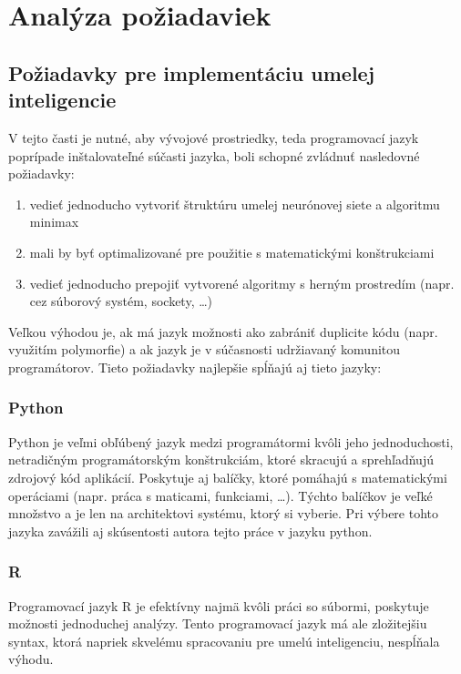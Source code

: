 \section{Analýza požiadaviek}\label{sec:requirements}

\subsection{Požiadavky pre implementáciu umelej inteligencie}\label{subsec:requirements-ai}

V tejto časti je nutné, aby vývojové prostriedky, teda programovací jazyk poprípade inštalovateľné súčasti jazyka, boli
schopné zvládnuť nasledovné požiadavky:
\begin{enumerate}
    \item vedieť jednoducho vytvoriť štruktúru umelej neurónovej siete a algoritmu minimax
    \item mali by byť optimalizované pre použitie s matematickými konštrukciami
    \item vedieť jednoducho prepojiť vytvorené algoritmy s herným prostredím (napr. cez súborový systém, sockety, \ldots)
\end{enumerate}
Veľkou výhodou je, ak má jazyk možnosti ako zabrániť duplicite kódu (napr. využitím polymorfie) a ak jazyk je v
súčasnosti udržiavaný komunitou programátorov.
Tieto požiadavky najlepšie spĺňajú\cite{best_ai_languages} aj tieto jazyky:

\subsubsection{Python}
Python je veľmi obľúbený jazyk medzi programátormi kvôli jeho jednoduchosti, netradičným programátorským
konštrukciám, ktoré skracujú a sprehľadňujú zdrojový kód aplikácií.
Poskytuje aj balíčky, ktoré pomáhajú s matematickými operáciami (napr. práca s maticami, funkciami, \dots).
Týchto balíčkov je veľké množstvo a je len na architektovi systému, ktorý si vyberie.
Pri výbere tohto jazyka zavážili aj skúsentosti autora tejto práce v jazyku python.

\subsubsection{R}

Programovací jazyk R je efektívny najmä kvôli práci so súbormi, poskytuje možnosti jednoduchej analýzy.
Tento programovací jazyk má ale zložitejšiu syntax, ktorá napriek skvelému spracovaniu pre umelú inteligenciu,
nespĺňala výhodu.

